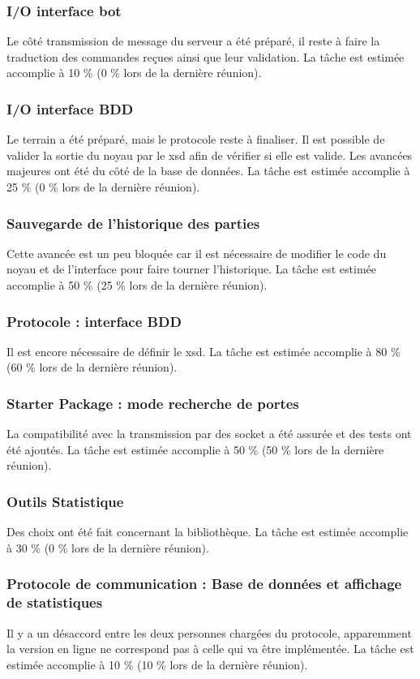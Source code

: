 \documentclass{article}
\newcommand {\accomplished}[2]{La tâche est estimée accomplie à #1 \%
(#2 \% lors de la dernière réunion).}
\begin{document}
\subsubsection*{I/O interface bot}
Le côté transmission de message du serveur a été préparé, il reste à faire la
traduction des commandes reçues ainsi que leur validation.
\accomplished{10}{0}

\subsubsection*{I/O interface BDD}
Le terrain a été préparé, mais le protocole reste à finaliser.
Il est possible de valider la sortie du noyau par le xsd afin de vérifier si
elle est valide.
Les avancées majeures ont été du côté de la base de données.
\accomplished{25}{0}


\subsubsection*{Sauvegarde de l'historique des parties}
Cette avancée est un peu bloquée car il est nécessaire de modifier le code du
noyau et de l'interface pour faire tourner l'historique.
\accomplished{50}{25}


\subsubsection*{Protocole : interface BDD}
Il est encore nécessaire de définir le xsd.
\accomplished{80}{60}


\subsubsection*{Starter Package : mode recherche de portes}
La compatibilité avec la transmission par des socket a été assurée et des
tests ont été ajoutés.
\accomplished{50}{50}

\subsubsection*{Outils Statistique}
Des choix ont été fait concernant la bibliothèque.
\accomplished{30}{0}

\subsubsection*{Protocole de communication : Base de données et affichage de
statistiques}
Il y a un désaccord entre les deux personnes chargées du protocole, apparemment
la version en ligne ne correspond pas à celle qui va être implémentée.
\accomplished{10}{10}
\end{document}
